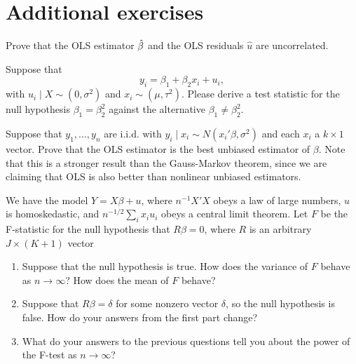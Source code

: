 

\section{Additional exercises}

\begin{hw}
  Prove that the OLS estimator $\hat{\beta}$ and the OLS residuals $\hat u$
  are uncorrelated.
\end{hw}

\begin{hw}
  Suppose that
  \begin{equation}
    y_i = \beta_1 + \beta_2 x_i + u_i,
  \end{equation}
  with $u_i \mid X \sim (0, \sigma^2)$ and $x_i \sim (\mu,\tau^2)$.
  Please derive a test statistic for the null hypothesis $\beta_1 =
  \beta_2^2$ against the alternative $\beta_1 \neq \beta_2^2$.
\end{hw}

\begin{hw}
  Suppose that $y_1,\dots,y_n$ are i.i.d. with $y_i \mid x_i \sim
  N(x_i'\beta, \sigma^2)$ and each $x_i$ a $k \times 1$ vector. Prove
  that the OLS estimator is the best unbiased estimator of $\beta$.
  Note that this is a stronger result than the Gauss-Markov theorem,
  since we are claiming that OLS is also better than nonlinear
  unbiased estimators.
\end{hw}

\begin{hw}
  We have the model $Y = X\beta + u$, where $n^{-1} X'X$ obeys a law
  of large numbers, $u$ is homoskedastic, and $n^{-1/2} \sum_i x_i
  u_i$ obeys a central limit theorem. Let $F$ be the F-statistic for
  the null hypothesis that $R\beta = 0$, where $R$ is an arbitrary $J
  \times (K + 1)$ vector
  \begin{enumerate}
  \item Suppose that the null hypothesis is true. How does the
    variance of $F$ behave as $n \to \infty$? How does the mean of
    $F$ behave?
  \item Suppose that $R\beta = \delta$ for some nonzero vector
    $\delta$, so the null hypothesis is false. How do your answers
    from the first part change?
  \item What do your answers to the previous questions tell you about
    the power of the F-test as $n \to \infty$?
  \end{enumerate}
\end{hw}


